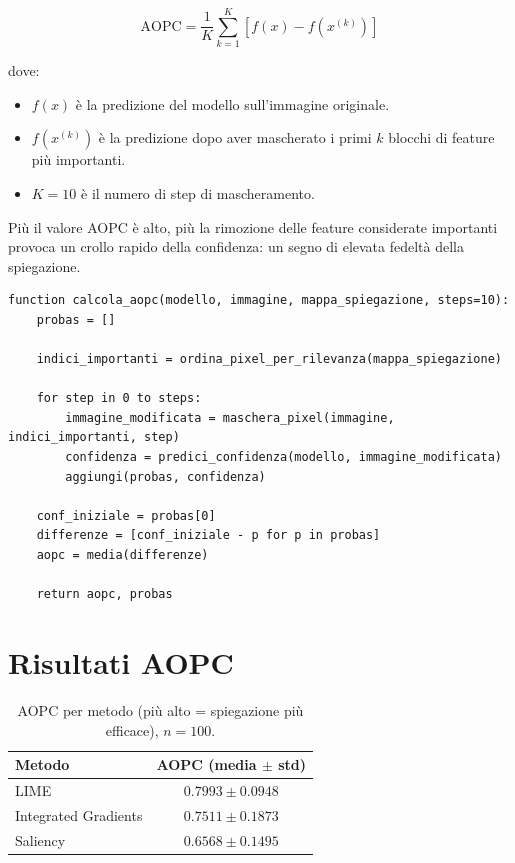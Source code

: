 \documentclass[12pt,a4paper,oneside]{report}
\numberwithin{figure}{chapter}
\numberwithin{table}{chapter}
\begin{document}
\[
      \mathrm{AOPC} = \frac{1}{K} \sum_{k=1}^K \left[ f(x) - f(x^{(k)}) \right]
\]

dove:
\begin{itemize}
      \item $f(x)$ è la predizione del modello sull’immagine originale.
      \item $f(x^{(k)})$ è la predizione dopo aver mascherato i primi $k$ blocchi di feature più importanti.
      \item $K=10$ è il numero di step di mascheramento.
\end{itemize}

Più il valore AOPC è alto, più la rimozione delle feature considerate
importanti provoca un crollo rapido della confidenza: un segno di elevata
fedeltà della spiegazione.

\begin{lstlisting}[caption={Procedura MoRF e calcolo AOPC}, label={lst:morf_aopc}]
function calcola_aopc(modello, immagine, mappa_spiegazione, steps=10):
    probas = []
    
    indici_importanti = ordina_pixel_per_rilevanza(mappa_spiegazione)
    
    for step in 0 to steps:
        immagine_modificata = maschera_pixel(immagine, indici_importanti, step)
        confidenza = predici_confidenza(modello, immagine_modificata)
        aggiungi(probas, confidenza)
    
    conf_iniziale = probas[0]
    differenze = [conf_iniziale - p for p in probas]
    aopc = media(differenze)
    
    return aopc, probas
\end{lstlisting}

\section{Risultati AOPC}
\begin{table}[h!]
      \centering
      \renewcommand{\arraystretch}{1.1}
      \begin{tabular}{lc}
            \hline
            \textbf{Metodo}      & \textbf{AOPC (media $\pm$ std)} \\
            \hline
            LIME                 & $0.7993 \pm 0.0948$             \\
            Integrated Gradients & $0.7511 \pm 0.1873$             \\
            Saliency             & $0.6568 \pm 0.1495$             \\
            \hline
      \end{tabular}
      \caption{AOPC per metodo (più alto = spiegazione più efficace), $n=100$.}
      \label{tab:aopc_results}
\end{table}
\end{document}
